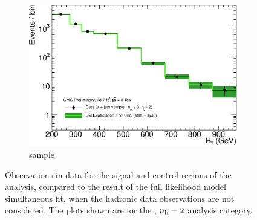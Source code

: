 \begin{figure}[h!]
\begin{subfigure}[b]{0.48\textwidth}
    \includegraphics[width=\textwidth]
    {Figs/results/v0/greenBand/single_plots/muon_2b_le3j_logy.pdf}
    \caption{\mj sample}
  \end{subfigure}
  \caption{Observations in data for the signal and control
  regions of the analysis, compared to the result of the full likelihood model
  simultaneous fit, when the hadronic data observations are not considered. The
  plots shown are for the \njlow, $n_{\text{b}} = 2$ analysis category.}
  \label{fig:green_fits_2b_le3j}
\end{figure}

